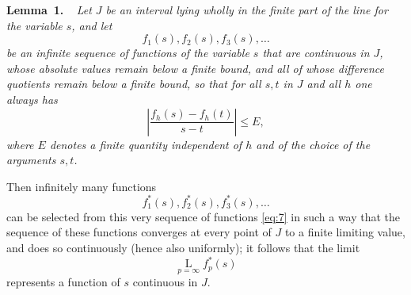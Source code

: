 \documentclass[b5paper,twoside]{article}
\makeatletter
\newcommand{\hilbertstatementname}[2]{%
  \textbf{#1\if\relax\detokenize{#2}\relax\else\ #2\fi.}%
}
\newenvironment{lemma}[1][]{%
  \par\addvspace{.7\baselineskip}%
  \phantomsection
  \protected@edef\@currentlabel{#1}%
  \noindent\hilbertstatementname{Lemma}{#1}\ \itshape\ignorespaces
}{%
  \par\addvspace{.7\baselineskip}%
}
\makeatother
\begin{document}
\begin{lemma}[1]\label{lem:1}
Let $J$ be an interval lying wholly in the finite part of the line for the
variable $s$, and let
\begin{equation}
\tag{7}\label{eq:7}
  f_1(s),f_2(s),f_3(s),\ldots
\end{equation}
be an infinite sequence of functions of the variable $s$ that are continuous
in $J$, whose absolute values remain below a finite bound, and all of whose
difference quotients remain below a finite bound, so that for all $s,t$ in
$J$ and all $h$ one always has
\[
  \left|\frac{f_h(s)-f_h(t)}{s-t}\right|\le E,
\]
where $E$ denotes a finite quantity independent of $h$ and of the choice of
the arguments $s,t$.

Then infinitely many functions
\[
  f_1^*(s),f_2^*(s),f_3^*(s),\ldots
\]
can be selected from this very sequence of functions \eqref{eq:7} in such a
way that the sequence of these functions converges at every point
of $J$ to a finite limiting value, and does so continuously (hence also
uniformly); it follows that the limit
\[
  \mathop{\mathrm{L}}\limits_{p=\infty}f_p^*(s)
\]
represents a function of $s$ continuous in $J$.
\end{lemma}
\end{document}
